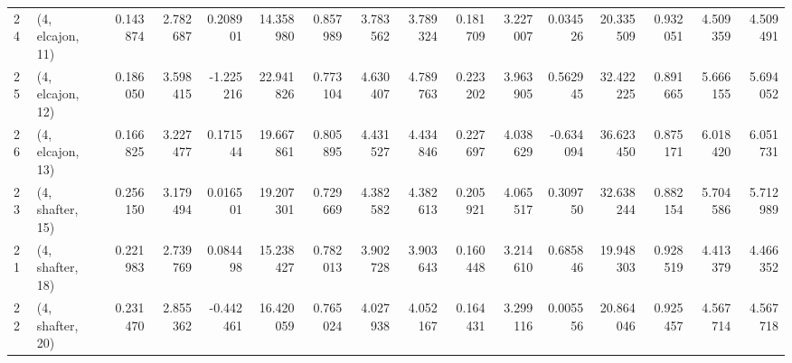 \begin{tabular}{llrrrrrrrrrrrrrr}
24 &  (4, elcajon, 11) &   0.143874 &  2.782687 &  0.208901 &  14.358980 &  0.857989 &   3.783562 &  3.789324 &  0.181709 &   3.227007 &  0.034526 &   20.335509 &  0.932051 &   4.509359 &   4.509491 \\
25 &  (4, elcajon, 12) &   0.186050 &  3.598415 & -1.225216 &  22.941826 &  0.773104 &   4.630407 &  4.789763 &  0.223202 &   3.963905 &  0.562945 &   32.422225 &  0.891665 &   5.666155 &   5.694052 \\
26 &  (4, elcajon, 13) &   0.166825 &  3.227477 &  0.171544 &  19.667861 &  0.805895 &   4.431527 &  4.434846 &  0.227697 &   4.038629 & -0.634094 &   36.623450 &  0.875171 &   6.018420 &   6.051731 \\
23 &  (4, shafter, 15) &   0.256150 &  3.179494 &  0.016501 &  19.207301 &  0.729669 &   4.382582 &  4.382613 &  0.205921 &   4.065517 &  0.309750 &   32.638244 &  0.882154 &   5.704586 &   5.712989 \\
21 &  (4, shafter, 18) &   0.221983 &  2.739769 &  0.084498 &  15.238427 &  0.782013 &   3.902728 &  3.903643 &  0.160448 &   3.214610 &  0.685846 &   19.948303 &  0.928519 &   4.413379 &   4.466352 \\
22 &  (4, shafter, 20) &   0.231470 &  2.855362 & -0.442461 &  16.420059 &  0.765024 &   4.027938 &  4.052167 &  0.164431 &   3.299116 &  0.005556 &   20.864046 &  0.925457 &   4.567714 &   4.567718 \\
\bottomrule
\end{tabular}
